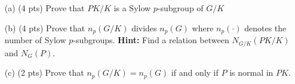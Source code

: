 \documentclass[12pt]{article}
\begin{document}
\begin{itemize}
\item[(a)] (4 pts) Prove that $PK/K$ is a Sylow $p$-subgroup of $G/K$

\item[(b)] (4 pts) Prove that $n_p(G/K)$ divides $n_p(G)$ where $n_p(\cdot)$ denotes
the number of Sylow $p$-subgroups. {\bf Hint:} Find a relation between $N_{G/K}(PK/K)$
and $N_G(P)$.
 
\item[(c)] (2 pts) Prove that $n_p(G/K)=n_p(G)$ if and only if $P$ is normal in $PK$.
\end{itemize}
\end{document}
